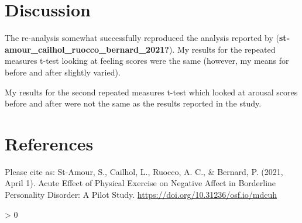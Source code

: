 \documentclass[
  english,
  man]{apa6}
\newlength{\cslhangindent}
\newenvironment{CSLReferences}[2] %
 {%
  \setlength{\parindent}{0pt}
  \ifodd #1 \everypar{\setlength{\hangindent}{\cslhangindent}}\ignorespaces\fi
  \ifnum #2 > 0
  \setlength{\parskip}{#2\baselineskip}
  \fi
 }%
 {}
\begin{document}
\hypertarget{discussion}{%
\section{Discussion}\label{discussion}}

The re-analysis somewhat successfully reproduced the analysis reported by (\textbf{st-amour\_cailhol\_ruocco\_bernard\_2021?}). My results for the repeated measures t-test looking at feeling scores were the same (however, my means for before and after slightly varied).

My results for the second repeated measures t-test which looked at arousal scores before and after were not the same as the results reported in the study.

\newpage

\hypertarget{references}{%
\section{References}\label{references}}

Please cite as: St-Amour, S., Cailhol, L., Ruocco, A. C., \& Bernard, P. (2021, April 1). Acute Effect
of Physical Exercise on Negative Affect in Borderline Personality Disorder: A Pilot Study.
\url{https://doi.org/10.31236/osf.io/mdcuh}

\begingroup
\setlength{\parindent}{-0.5in}
\setlength{\leftskip}{0.5in}

\hypertarget{refs}{}
\begin{CSLReferences}{0}{0}
\end{CSLReferences}

\endgroup
\end{document}
